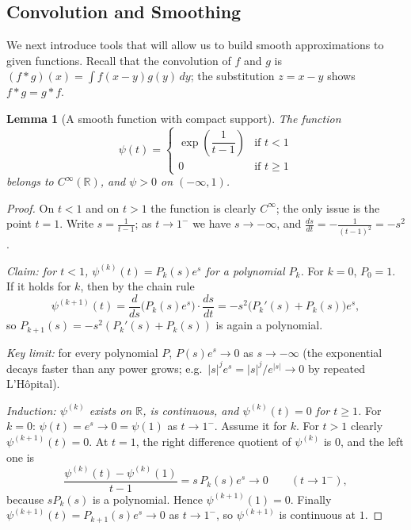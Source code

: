 \documentclass[11pt]{article}
\theoremstyle{plain}
\newtheorem{lemma}[theorem]{Lemma}
\theoremstyle{definition}
\theoremstyle{remark}
\begin{document}
\subsection{Convolution and Smoothing}\label{ssec:mollifiers}
We next introduce tools that will allow us to build smooth approximations to given functions. Recall that the convolution of $f$ and $g$ is $(f * g)(x) = \int f(x-y) g(y)\, dy$; the substitution $z = x - y$ shows $f * g = g * f$.

\begin{lemma}[A smooth function with compact support]\label{lem:psi}
The function
$$ \psi(t) = \begin{cases} \exp\left(\dfrac{1}{t - 1}\right) & \text{if } t < 1 \\ 0 & \text{if } t \geq 1 \end{cases} $$
belongs to $C^\infty(\mathbb{R})$, and $\psi > 0$ on $(-\infty, 1)$.
\end{lemma}
\begin{proof}
On $t < 1$ and on $t > 1$ the function is clearly $C^\infty$; the only issue is the point $t = 1$. Write $s = \frac{1}{t-1}$; as $t \to 1^-$ we have $s \to -\infty$, and $\frac{ds}{dt} = -\frac{1}{(t-1)^2} = -s^2$.

\emph{Claim: for $t < 1$, $\psi^{(k)}(t) = P_k(s) e^{s}$ for a polynomial $P_k$.} For $k = 0$, $P_0 = 1$. If it holds for $k$, then by the chain rule
$$ \psi^{(k+1)}(t) = \frac{d}{ds}\big(P_k(s) e^s\big)\cdot\frac{ds}{dt} = -s^2\big(P_k'(s) + P_k(s)\big) e^s, $$
so $P_{k+1}(s) = -s^2(P_k'(s) + P_k(s))$ is again a polynomial.

\emph{Key limit:} for every polynomial $P$, $P(s) e^s \to 0$ as $s \to -\infty$ (the exponential decays faster than any power grows; e.g.\ $|s|^j e^{s} = |s|^j / e^{|s|} \to 0$ by repeated L'H\^opital).

\emph{Induction: $\psi^{(k)}$ exists on $\mathbb{R}$, is continuous, and $\psi^{(k)}(t) = 0$ for $t \geq 1$.} For $k = 0$: $\psi(t) = e^s \to 0 = \psi(1)$ as $t \to 1^-$. Assume it for $k$. For $t > 1$ clearly $\psi^{(k+1)}(t) = 0$. At $t = 1$, the right difference quotient of $\psi^{(k)}$ is $0$, and the left one is
$$ \frac{\psi^{(k)}(t) - \psi^{(k)}(1)}{t - 1} = s\, P_k(s) e^s \to 0 \qquad (t \to 1^-), $$
because $sP_k(s)$ is a polynomial. Hence $\psi^{(k+1)}(1) = 0$. Finally $\psi^{(k+1)}(t) = P_{k+1}(s)e^s \to 0$ as $t \to 1^-$, so $\psi^{(k+1)}$ is continuous at $1$.
\end{proof}
\end{document}
